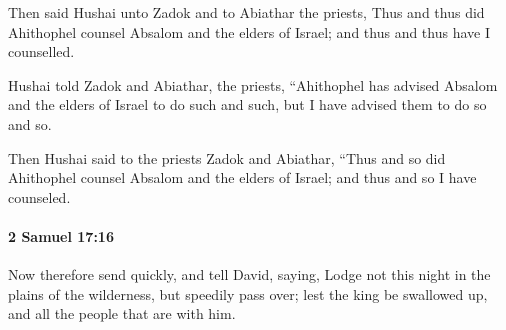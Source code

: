 			\begin{versebox}
					\item[BHS] 
					\item[ASV] Then said Hushai unto Zadok and to Abiathar the priests, Thus and thus did Ahithophel counsel Absalom and the elders of Israel; and thus and thus have I counselled.
					\item[NIV] Hushai told Zadok and Abiathar, the priests, “Ahithophel has advised Absalom and the elders of Israel to do such and such, but I have advised them to do so and so.
					\item[NRSV] Then Hushai said to the priests Zadok and Abiathar, “Thus and so did Ahithophel counsel Absalom and the elders of Israel; and thus and so I have counseled.
			\end{versebox}

		\paragraph{2 Samuel 17:16} %
			\label{2SAMUEL-17-16}

			Now therefore send quickly, and tell David, saying, Lodge not this night in the plains of the wilderness, but speedily pass over; lest the king be swallowed up, and all the people that are with him.

